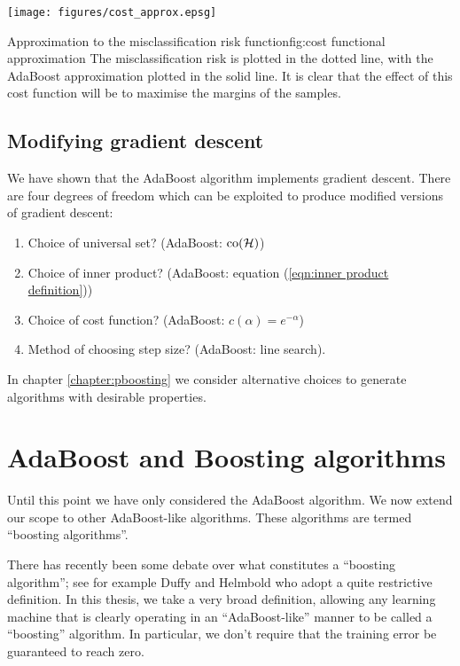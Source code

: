 \begin{linefigure}
\begin{center}
\texttt{[image: figures/cost\_approx.epsg]}
\end{center}
\begin{capt}{Approximation to the misclassification risk
function}{fig:cost functional approximation}
The misclassification risk is plotted in the dotted line, with the
AdaBoost approximation plotted in the solid line.  It is clear that
the effect of this cost function will be to maximise the margins of
the samples.
\end{capt}
\end{linefigure}

\subsection{Modifying gradient descent}

We have shown that the AdaBoost algorithm implements gradient descent.
There are four degrees of freedom which can be exploited to produce
modified versions of gradient descent:
%
\begin{enumerate}
\item	Choice of universal set? (AdaBoost: $\mathrm{co}(\mathcal{H})$)
\item	Choice of inner product? (AdaBoost: equation (\ref{eqn:inner
	product definition}))
\item	Choice of cost function? (AdaBoost: $c(\alpha) =
	e^{-\alpha}$)
\item	Method of choosing step size? (AdaBoost: line search).
\end{enumerate}
%
In chapter \ref{chapter:pboosting} we consider alternative choices to
generate algorithms with desirable properties.


\section{AdaBoost and Boosting algorithms}

Until this point we have only considered the AdaBoost algorithm.  We
now extend our scope to other AdaBoost-like algorithms.  These
algorithms are termed ``boosting algorithms''.

There has recently been some debate over what constitutes a ``boosting
algorithm''; see for example Duffy and Helmbold \cite{Duffy99} who
adopt a quite restrictive definition.  In this thesis, we take a very
broad definition, allowing any learning machine that is clearly
operating in an ``AdaBoost-like'' manner to be called a ``boosting''
algorithm.  In particular, we don't require that the training error be
guaranteed to reach zero.


